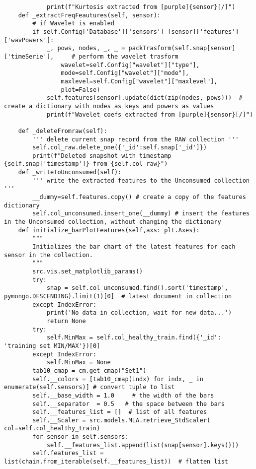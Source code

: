 \begin{verbatim}
            print(f"Kurtosis extracted from [purple]{sensor}[/]")
    def _extractFreqFeautures(self, sensor):
        # if Wavelet is enabled
        if self.Config['Database']['sensors'] [sensor]['features']['wavPowers']:    
            _, pows, nodes, _, _ = packTrasform(self.snap[sensor]['timeSerie'],     # perform the wavelet trasform
                wavelet=self.Config["wavelet"]["type"],
                mode=self.Config["wavelet"]["mode"],
                maxlevel=self.Config["wavelet"]["maxlevel"], 
                plot=False)
            self.features[sensor].update(dict(zip(nodes, pows)))  # create a dictionary with nodes as keys and powers as values
            print(f"Wavelet coefs extracted from [purple]{sensor}[/]")
                
    def _deleteFromraw(self):
        ''' delete current snap record from the RAW collection '''
        self.col_raw.delete_one({'_id':self.snap['_id']})
        print(f"Deleted snapshot with timestamp {self.snap['timestamp']} from {self.col_raw}")
    def _writeToUnconsumed(self):
        ''' write the extracted features to the Unconsumed collection '''
        __dummy=self.features.copy() # create a copy of the features dictionary
        self.col_unconsumed.insert_one(__dummy) # insert the features in the Unconsumed collection, without changing the dictionary
    def initialize_barPlotFeatures(self,axs: plt.Axes):
        """
        Initializes the bar chart of the latest features for each sensor in the collection.
        """
        src.vis.set_matplotlib_params()
        try:
            snap = self.col_unconsumed.find().sort('timestamp', pymongo.DESCENDING).limit(1)[0]  # latest document in collection
        except IndexError:
            print('No data in collection, wait for new data...')
            return None
        try:
            self.MinMax = self.col_healthy_train.find({'_id': 'training set MIN/MAX'})[0]
        except IndexError:
            self.MinMax = None
        tab10_cmap = cm.get_cmap("Set1")
        self.__colors = [tab10_cmap(indx) for indx, _ in enumerate(self.sensors)] # convert tuple to list
        self.__base_width = 1.0     # the width of the bars
        self.__separator  = 0.5   # the space between the bars
        self.__features_list = []  # list of all features
        self.__Scaler = src.models.MLA.retrieve_StdScaler( col=self.col_healthy_train)
        for sensor in self.sensors:
            self.__features_list.append(list(snap[sensor].keys()))
        self.features_list = list(chain.from_iterable(self.__features_list))  # flatten list

\end{verbatim}
